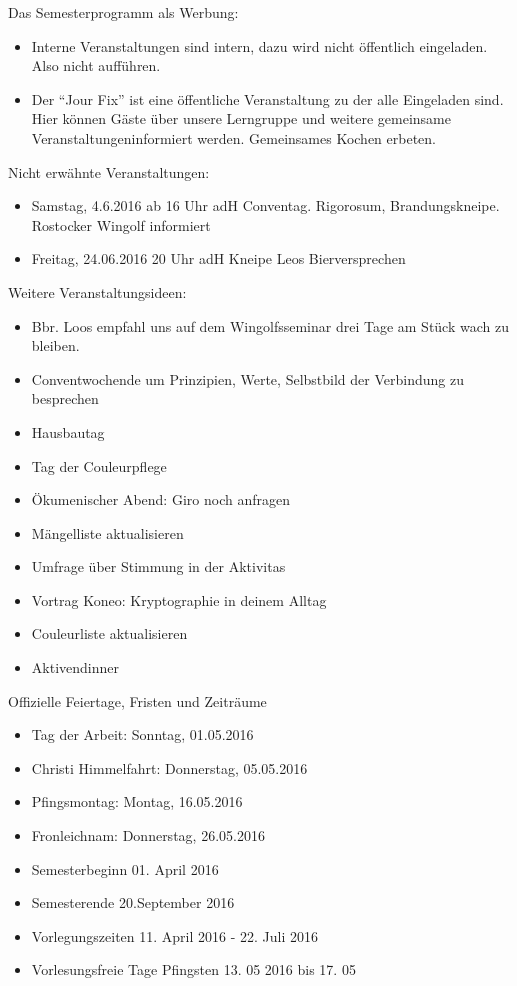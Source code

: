 %
% 


Das Semesterprogramm als Werbung:
\begin{itemize}
\item Interne Veranstaltungen sind intern, dazu wird nicht öffentlich eingeladen. Also nicht aufführen.
\item Der \enquote{Jour Fix} ist eine öffentliche Veranstaltung zu der alle Eingeladen sind. Hier können Gäste über unsere Lerngruppe und weitere gemeinsame Veranstaltungeninformiert werden. Gemeinsames Kochen erbeten.
\end{itemize}
Nicht erwähnte Veranstaltungen:
\begin{itemize}
\item Samstag, 4.6.2016 ab 16 Uhr adH Conventag. Rigorosum, Brandungskneipe. Rostocker Wingolf informiert
\item Freitag, 24.06.2016 20 Uhr adH Kneipe Leos Bierversprechen
\end{itemize}
Weitere Veranstaltungsideen:
\begin{itemize}
\item Bbr. Loos empfahl uns auf dem Wingolfsseminar drei Tage am Stück wach zu bleiben. 
\item Conventwochende um Prinzipien, Werte, Selbstbild der Verbindung zu besprechen
\item Hausbautag
\item Tag der Couleurpflege
\item Ökumenischer Abend: Giro noch anfragen
\item Mängelliste aktualisieren
\item Umfrage über Stimmung in der Aktivitas
\item Vortrag Koneo: Kryptographie in deinem Alltag
\item Couleurliste aktualisieren
\item Aktivendinner
\end{itemize}
Offizielle Feiertage, Fristen und Zeiträume
\begin{itemize}
\item Tag der Arbeit: Sonntag, 01.05.2016
\item Christi Himmelfahrt: Donnerstag, 05.05.2016
\item Pfingsmontag: Montag, 16.05.2016
\item Fronleichnam: Donnerstag, 26.05.2016
\item Semesterbeginn 01. April 2016
\item Semesterende 20.September 2016
\item Vorlegungszeiten 11. April 2016 - 22. Juli 2016
\item Vorlesungsfreie Tage Pfingsten 13. 05 2016 bis 17. 05
\end{itemize}